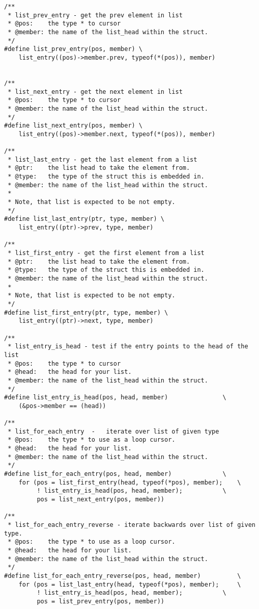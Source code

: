 \documentclass{article}
\begin{document}
\begin{lstlisting}[style=CStyle]
/**
 * list_prev_entry - get the prev element in list
 * @pos:	the type * to cursor
 * @member:	the name of the list_head within the struct.
 */
#define list_prev_entry(pos, member) \
	list_entry((pos)->member.prev, typeof(*(pos)), member)


/**
 * list_next_entry - get the next element in list
 * @pos:	the type * to cursor
 * @member:	the name of the list_head within the struct.
 */
#define list_next_entry(pos, member) \
	list_entry((pos)->member.next, typeof(*(pos)), member)

/**
 * list_last_entry - get the last element from a list
 * @ptr:	the list head to take the element from.
 * @type:	the type of the struct this is embedded in.
 * @member:	the name of the list_head within the struct.
 *
 * Note, that list is expected to be not empty.
 */
#define list_last_entry(ptr, type, member) \
	list_entry((ptr)->prev, type, member)

/**
 * list_first_entry - get the first element from a list
 * @ptr:	the list head to take the element from.
 * @type:	the type of the struct this is embedded in.
 * @member:	the name of the list_head within the struct.
 *
 * Note, that list is expected to be not empty.
 */
#define list_first_entry(ptr, type, member) \
	list_entry((ptr)->next, type, member)

/**
 * list_entry_is_head - test if the entry points to the head of the list
 * @pos:	the type * to cursor
 * @head:	the head for your list.
 * @member:	the name of the list_head within the struct.
 */
#define list_entry_is_head(pos, head, member)				\
	(&pos->member == (head))

/**
 * list_for_each_entry	-	iterate over list of given type
 * @pos:	the type * to use as a loop cursor.
 * @head:	the head for your list.
 * @member:	the name of the list_head within the struct.
 */
#define list_for_each_entry(pos, head, member)				\
	for (pos = list_first_entry(head, typeof(*pos), member);	\
	     ! list_entry_is_head(pos, head, member);			\
	     pos = list_next_entry(pos, member))

/**
 * list_for_each_entry_reverse - iterate backwards over list of given type.
 * @pos:	the type * to use as a loop cursor.
 * @head:	the head for your list.
 * @member:	the name of the list_head within the struct.
 */
#define list_for_each_entry_reverse(pos, head, member)			\
	for (pos = list_last_entry(head, typeof(*pos), member);		\
	     ! list_entry_is_head(pos, head, member); 			\
	     pos = list_prev_entry(pos, member))


\end{lstlisting}
\end{document}
